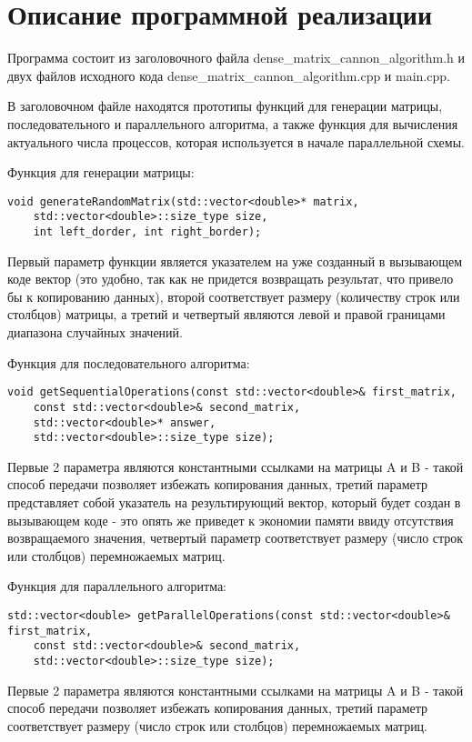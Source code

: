 \documentclass{report}
\begin{document}
\section*{Описание программной реализации}
Программа состоит из заголовочного файла dense\_matrix\_cannon\_algorithm.h и двух файлов исходного кода dense\_matrix\_cannon\_algorithm.cpp и main.cpp.
\par В заголовочном файле находятся прототипы функций для генерации матрицы, последовательного и параллельного алгоритма, а также функция для вычисления актуального числа процессов, которая используется в начале параллельной схемы.
\par Функция для генерации матрицы:
\begin{lstlisting}
void generateRandomMatrix(std::vector<double>* matrix,
    std::vector<double>::size_type size,
    int left_dorder, int right_border);
\end{lstlisting}
Первый параметр функции является указателем на уже созданный в вызывающем коде вектор (это удобно, так как не придется возвращать результат, что привело бы к копированию данных), второй соответствует размеру (количеству строк или столбцов) матрицы, а третий и четвертый являются левой и правой границами диапазона случайных значений.
\par Функция для последовательного алгоритма:
\begin{lstlisting}
void getSequentialOperations(const std::vector<double>& first_matrix,
    const std::vector<double>& second_matrix,
    std::vector<double>* answer,
    std::vector<double>::size_type size); 
\end{lstlisting}
Первые 2 параметра являются константными ссылками на матрицы A и B - такой способ передачи позволяет избежать копирования данных, третий параметр представляет собой указатель на результирующий вектор, который будет создан в вызывающем коде - это опять же приведет к экономии памяти ввиду отсутствия возвращаемого значения, четвертый параметр соответствует размеру (число строк или столбцов) перемножаемых матриц.
\par Функция для параллельного алгоритма:
\begin{lstlisting}
std::vector<double> getParallelOperations(const std::vector<double>& first_matrix,
    const std::vector<double>& second_matrix,
    std::vector<double>::size_type size);
\end{lstlisting}
Первые 2 параметра являются константными ссылками на матрицы A и B - такой способ передачи позволяет избежать копирования данных, третий параметр соответствует размеру (число строк или столбцов) перемножаемых матриц.
\end{document}
